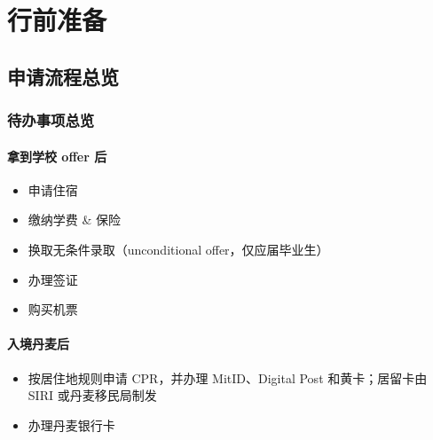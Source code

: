 \section{行前准备}

\subsection{申请流程总览}

\subsubsection{待办事项总览}

\paragraph*{拿到学校 offer 后}


\begin{itemize}[label=•, itemsep=2pt, leftmargin=2em]
  \item 申请住宿
  \item 缴纳学费 \& 保险
  \item 换取无条件录取（unconditional offer，仅应届毕业生）
  \item 办理签证
  \item 购买机票
\end{itemize}

\paragraph*{入境丹麦后}

\begin{itemize}[label=•, itemsep=2pt, leftmargin=2em]
  \item 按居住地规则申请 CPR，并办理 MitID、Digital Post 和黄卡；居留卡由 SIRI 或丹麦移民局制发
  \item 办理丹麦银行卡
\end{itemize}

